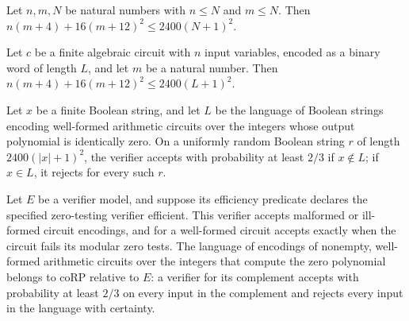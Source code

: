 \begin{theorem}
\label{Randomized.testLen_le_polyLen_of_le}
\leanok
{}
Let $n,m,N$ be natural numbers with $n\le N$ and $m\le N$. Then $n(m+4)+16(m+12)^2\le
2400(N+1)^2$.
\end{theorem}

\begin{theorem}
\label{Randomized.testLen_le_polyLen}
\leanok
{}
Let $c$ be a finite algebraic circuit with $n$ input variables, encoded as a binary word
of length $L$, and let $m$ be a natural number. Then $n(m+4)+16(m+12)^2\le 2400(L+1)^2$.
\end{theorem}

\begin{theorem}
\label{Randomized.zeropVerifier_spec}
\leanok
{}
Let $x$ be a finite Boolean string, and let $L$ be the language of Boolean strings
encoding well-formed arithmetic circuits over the integers whose output polynomial is
identically zero. On a uniformly random Boolean string $r$ of length $2400(|x|+1)^2$,
the verifier accepts with probability at least $2/3$ if $x\notin L$; if $x\in L$, it
rejects for every such $r$.
\end{theorem}

\begin{theorem}
\label{Randomized.inCoRP_ZEROP}
\leanok
{}
Let $E$ be a verifier model, and suppose its efficiency predicate declares the specified
zero-testing verifier efficient. This verifier accepts malformed or ill-formed circuit
encodings, and for a well-formed circuit accepts exactly when the circuit fails its
modular zero tests. The language of encodings of nonempty, well-formed arithmetic
circuits over the integers that compute the zero polynomial belongs to coRP relative to
$E$: a verifier for its complement accepts with probability at least $2/3$ on every
input in the complement and rejects every input in the language with certainty.
\end{theorem}
